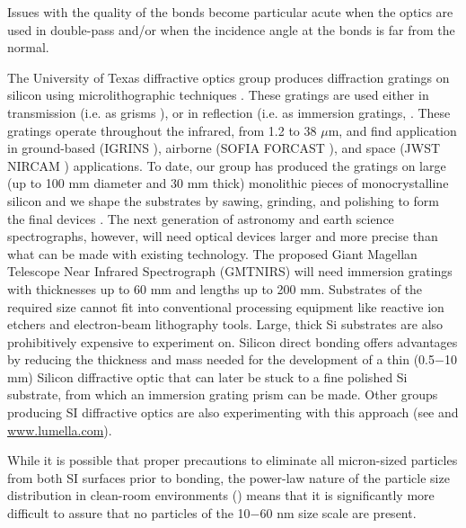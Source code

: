 \documentclass[osajnl,preprint,showpacs,superscriptaddress,12pt]{revtex4-1} %
\begin{document}
Issues with the quality of the bonds become particular acute when the optics are used in double-pass and/or when the incidence angle at the bonds is far from the normal.

The University of Texas diffractive optics group produces diffraction gratings on silicon using microlithographic techniques \cite{1998SPIE.3354..201J, 2010SPIE.7739E.146W}.  These gratings are used either in transmission (i.e. as grisms \cite{2008SPIE.7014E..77D, 2010SPIE.7739E.123G}), or in reflection (i.e. as immersion gratings, \cite{2007ApOpt..46.3400M, 2010SPIE.7739E.146W, 2012SPIE.8450E..2SG}.  These gratings operate throughout the infrared, from 1.2 to 38 $\mu$m, and find application in ground-based (IGRINS \cite{2010SPIE.7735E..54Y, 2012SPIE.8450E..2SG}), airborne (SOFIA FORCAST \cite{2008SPIE.7014E..77D}), and space (JWST NIRCAM \cite{2005SPIE.5904...21B, 2010SPIE.7739E.123G}) applications.  To date, our group has produced the gratings on large (up to 100 mm diameter and 30 mm thick) monolithic pieces of monocrystalline silicon and we shape the substrates by sawing, grinding, and polishing to form the final devices \cite{2010SPIE.7739E.146W}.  The next generation of astronomy and earth science spectrographs, however, will need optical devices larger and more precise than what can be made with existing technology.  The proposed Giant Magellan Telescope\cite{2012SPIE.8444E..1HJ} Near Infrared Spectrograph\cite{2006SPIE.6269E.143J, 2010SPIE.7735E..87L} (GMTNIRS) will need immersion gratings with thicknesses up to 60 mm and lengths up to 200 mm.  Substrates of the required size cannot fit into conventional processing equipment like reactive ion etchers and electron-beam lithography tools.  Large, thick Si substrates are also prohibitively expensive to experiment on.  Silicon direct bonding\cite{1986JAP....60.2987S, 2012SPIE.8450E..2TV} offers advantages by reducing the thickness and mass needed for the development of a thin (0.5$-$10 mm) Silicon diffractive optic that can later be stuck to a fine polished Si substrate, from which an immersion grating prism can be made.  Other groups producing SI diffractive optics are also experimenting with this approach (see \cite{2012SPIE.8450E..2TV} and \url{www.lumella.com}).

While it is possible that proper precautions to eliminate all micron-sized particles from both SI surfaces prior to bonding, the power-law nature of the particle size distribution in clean-room environments (\cite{doi:10.1080/02786828608959094}) means that it is significantly more difficult to assure that no particles of the 10$-$60 nm size scale are present.
\end{document}
